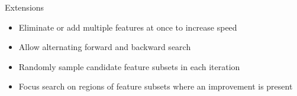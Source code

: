 \documentclass[11pt,compress,t,notes=noshow, xcolor=table]{beamer}
\begin{document}
  \begin{vbframe}{Extensions}
    \vspace{-0.1cm}
    \begin{itemize}
      \setlength{\itemsep}{1.2em}
      \item Eliminate or add multiple features at once to increase speed
      \item Allow alternating forward and backward search
      \item Randomly sample candidate feature subsets in each iteration
      \item Focus search on regions of feature subsets where an improvement is present
    \end{itemize}
\end{vbframe}
\end{document}

